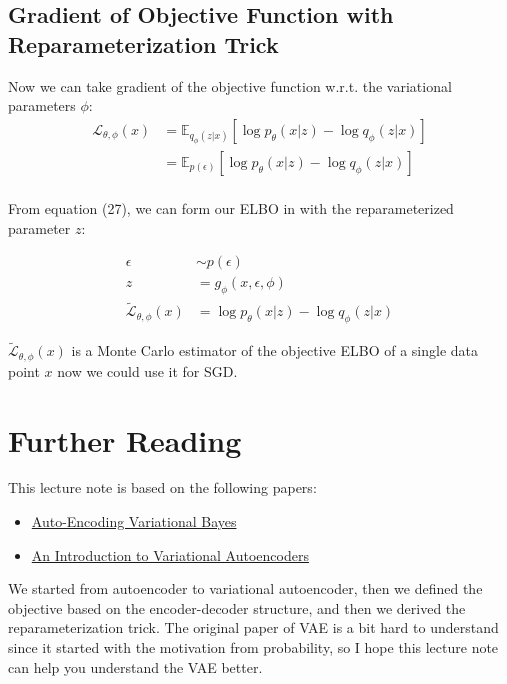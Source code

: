 \documentclass[11pt]{article}
\theoremstyle{definition}
\begin{document}
\subsection{Gradient of Objective Function with Reparameterization Trick}

Now we can take gradient of the objective function w.r.t. the variational parameters $\phi$:
\begin{align}
    \mathcal{L}_{\theta, \phi}(x) &= \mathbb{E}_{q_\phi(z|x)}[\log p_\theta(x|z) - \log q_\phi(z|x)]\\
    &= \mathbb{E}_{p(\epsilon)}[\log p_\theta(x|z) - \log q_\phi(z|x)]\\
\end{align}

From equation (27), we can form our ELBO in with the reparameterized parameter $z$:

\begin{align}
    \epsilon &\sim p(\epsilon)\\
    z &= g_\phi(x, \epsilon, \phi)\\
    \mathcal{\tilde{L}}_{\theta, \phi}(x) &= \log p_\theta(x|z) - \log q_\phi(z|x)
\end{align}

$\mathcal{\tilde{L}}_{\theta, \phi}(x)$ is a Monte Carlo estimator of the objective ELBO of a single data point $x$ now we could use it for SGD.

\section{Further Reading}

This lecture note is based on the following papers:

\begin{itemize}
    \item \href{https://arxiv.org/abs/1312.6114}{Auto-Encoding Variational Bayes}
    \item \href{https://arxiv.org/abs/1906.02691}{An Introduction to Variational Autoencoders}
\end{itemize}

We started from autoencoder to variational autoencoder, then we defined the objective based on the encoder-decoder structure, and then we derived the reparameterization trick. The original paper of VAE is a bit hard to understand since it started with the motivation from probability, so I hope this lecture note can help you understand the VAE better.
\end{document}
